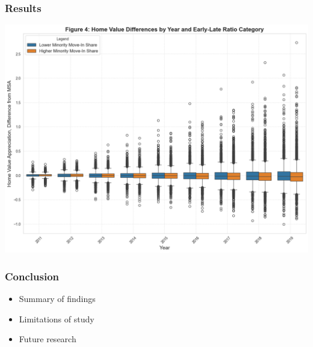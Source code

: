 \documentclass{beamer}
\begin{document}
\begin{frame}
    \frametitle{Results}
    \includegraphics[width=\textwidth]{project_files/project_49_1.png}
\end{frame}
\begin{frame}
\frametitle{Conclusion}
\begin{itemize}
    \item Summary of findings
    \item Limitations of study
    \item Future research
\end{itemize}
\end{frame}
\end{document}
